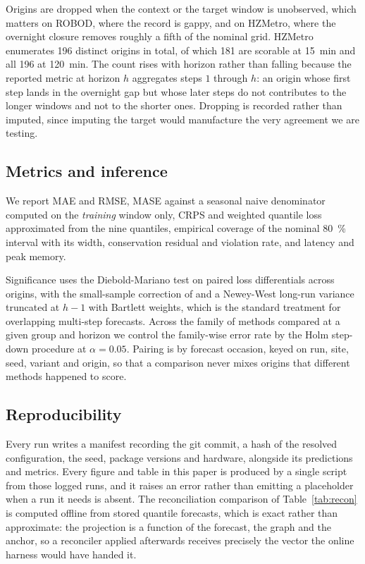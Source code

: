 \documentclass[11pt]{article}
\theoremstyle{plain}
\theoremstyle{definition}
\theoremstyle{remark}
\begin{document}
Origins are dropped when the context or the target window is unobserved, which matters on ROBOD, where the record is gappy, and on HZMetro, where the overnight closure removes roughly a fifth of the nominal grid. HZMetro enumerates \num{196} distinct origins in total, of which \num{181} are scorable at \SI{15}{\minute} and all \num{196} at \SI{120}{\minute}. The count rises with horizon rather than falling because the reported metric at horizon $h$ aggregates steps $1$ through $h$: an origin whose first step lands in the overnight gap but whose later steps do not contributes to the longer windows and not to the shorter ones. Dropping is recorded rather than imputed, since imputing the target would manufacture the very agreement we are testing.

\subsection{Metrics and inference}

We report MAE and RMSE, MASE against a seasonal naive denominator computed on the \emph{training} window only, CRPS and weighted quantile loss approximated from the nine quantiles, empirical coverage of the nominal \SI{80}{\percent} interval with its width, conservation residual and violation rate, and latency and peak memory.

Significance uses the Diebold-Mariano test \citep{diebold1995} on paired loss differentials across origins, with the small-sample correction of \citet{harvey1997} and a Newey-West long-run variance \citep{newey1987} truncated at $h-1$ with Bartlett weights, which is the standard treatment for overlapping multi-step forecasts. Across the family of methods compared at a given group and horizon we control the family-wise error rate by the Holm step-down procedure \citep{holm1979} at $\alpha=0.05$. Pairing is by forecast occasion, keyed on run, site, seed, variant and origin, so that a comparison never mixes origins that different methods happened to score.

\subsection{Reproducibility}

Every run writes a manifest recording the git commit, a hash of the resolved configuration, the seed, package versions and hardware, alongside its predictions and metrics. Every figure and table in this paper is produced by a single script from those logged runs, and it raises an error rather than emitting a placeholder when a run it needs is absent. The reconciliation comparison of Table~\ref{tab:recon} is computed offline from stored quantile forecasts, which is exact rather than approximate: the projection is a function of the forecast, the graph and the anchor, so a reconciler applied afterwards receives precisely the vector the online harness would have handed it.
\end{document}
